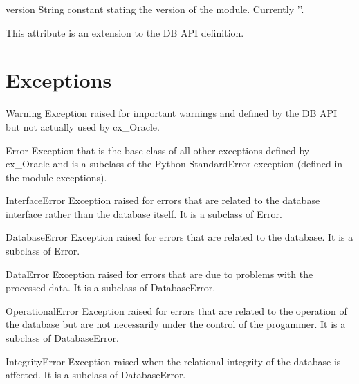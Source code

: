 \documentclass{manual}
\begin{document}
\begin{datadesc}{version}
  String constant stating the version of the module. Currently '\version{}'.

   This attribute is an extension to the DB API definition.
\end{datadesc}

\section{Exceptions}

\begin{datadesc}{Warning}
  Exception raised for important warnings and defined by the DB API but not
  actually used by cx_Oracle.
\end{datadesc}

\begin{datadesc}{Error}
  Exception that is the base class of all other exceptions defined by
  cx_Oracle and is a subclass of the Python StandardError exception (defined in
  the module exceptions).
\end{datadesc}

\begin{datadesc}{InterfaceError}
  Exception raised for errors that are related to the database interface rather
  than the database itself. It is a subclass of Error.
\end{datadesc}

\begin{datadesc}{DatabaseError}
  Exception raised for errors that are related to the database. It is a
  subclass of Error.
\end{datadesc}

\begin{datadesc}{DataError}
  Exception raised for errors that are due to problems with the processed data.
  It is a subclass of DatabaseError.
\end{datadesc}

\begin{datadesc}{OperationalError}
  Exception raised for errors that are related to the operation of the database
  but are not necessarily under the control of the progammer. It is a
  subclass of DatabaseError.
\end{datadesc}

\begin{datadesc}{IntegrityError}
  Exception raised when the relational integrity of the database is affected.
  It is a subclass of DatabaseError.
\end{datadesc}
 
\end{document}
